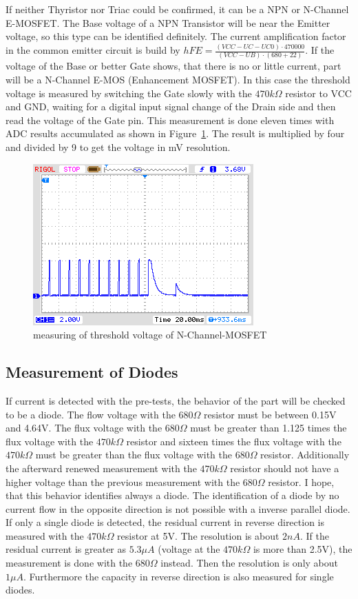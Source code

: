If neither Thyristor nor Triac could be confirmed, it can be a NPN or N-Channel E-MOSFET.
The Base voltage of a NPN Transistor will be near the Emitter voltage, so this type can be identified definitely.
The current amplification factor in the common emitter circuit is build by \(hFE = \frac{(VCC-UC-UC0)\cdot 470000}{(VCC-UB)\cdot (680+22)}\).
If the voltage of the Base or better Gate  shows, that there is no or little current, part will be a N-Channel E-MOS 
(Enhancement MOSFET). In this case the threshold voltage is measured by switching the Gate slowly with
the \(470k\Omega\) resistor to VCC and GND, waiting for a digital input signal change of the Drain side and
then read the voltage of the Gate pin. This measurement is done eleven times with ADC results accumulated as
shown in Figure~\ref{fig:eleven}. The result is multiplied by four and divided by 9 to get the voltage in mV resolution.
\begin{figure}[H]
\centering
\includegraphics[]{../PNG/IRFU120gate.png}
\caption{measuring of threshold voltage of N-Channel-MOSFET}
\label{fig:eleven}
\end{figure}

\subsection{Measurement of Diodes}
\label{sec:diode}
If current is detected with the pre-tests, the behavior of the part will be checked to
be a diode. The flow voltage with the \(680\Omega\) resistor must be between 0.15V and 4.64V.
The flux voltage with the \(680\Omega\) must be greater than 1.125 times the flux voltage with
the \(470k\Omega\) resistor and sixteen times the flux voltage with the \(470k\Omega\) must be
greater than the flux voltage with the \(680\Omega\) resistor.
Additionally the afterward renewed measurement with the \(470k\Omega\) resistor should not have a higher voltage than
the previous measurement with the \(680\Omega\) resistor.
I hope, that this behavior identifies always a diode. The identification of a diode by no current flow
in the opposite direction is not possible with a inverse parallel diode.
If only a single diode is detected, the residual current in reverse direction is measured with
the \(470k\Omega\) resistor at 5V. The resolution is about \(2nA\).
If the residual current is greater as \(5.3\mu A\) (voltage at
the \(470k\Omega\) is more than 2.5V), the measurement is done with the \(680\Omega\) instead.
Then the resolution is only about \(1\mu A\).
Furthermore  the capacity in reverse direction is also measured for single diodes.



